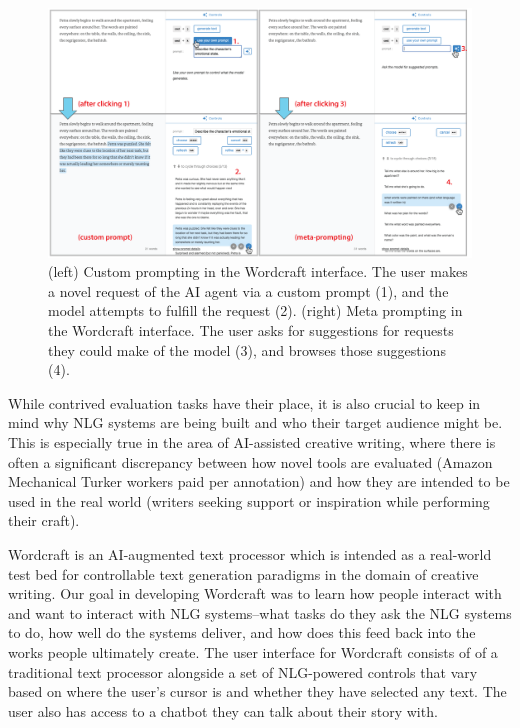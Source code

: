 \begin{figure}[tbh]
  \centering
  \includegraphics[width=0.99\linewidth]{figures/interface_meta_custom}
  \caption{(left) Custom prompting in the Wordcraft interface. The user makes a novel request of the AI agent via a custom prompt (1), and the model attempts to fulfill the request (2). (right) Meta prompting in the Wordcraft interface. The user asks for suggestions for requests they could make of the model (3), and browses those suggestions (4).}
  \label{fig:interface_meta_custom}
\end{figure}

While contrived evaluation tasks have their place, it is also crucial to keep in mind why NLG systems are being built and who their target audience might be.
This is especially true in the area of AI-assisted creative writing, where there is often a significant discrepancy between how novel tools are evaluated (Amazon Mechanical Turker workers paid per annotation) and how they are intended to be used in the real world (writers seeking support or inspiration while performing their craft).

Wordcraft is an AI-augmented text processor which is intended as a real-world test bed for controllable text generation paradigms in the domain of creative writing.
Our goal in developing Wordcraft was to learn how people interact with and want to interact with NLG systems--what tasks do they ask the NLG systems to do, how well do the systems deliver, and how does this feed back into the works people ultimately create.
The user interface for Wordcraft consists of of a traditional text processor alongside a set of NLG-powered controls that vary based on where the user's cursor is and whether they have selected any text.
The user also has access to a chatbot they can talk about their story with.

